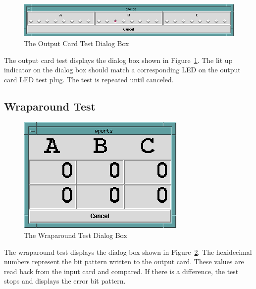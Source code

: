 \begin{figure}[hbpt]
\begin{centering}
\includegraphics{UTOutputTest.png}
\caption{The Output Card Test Dialog Box}
\label{fig:ut:outtest}
\end{centering}
\end{figure}
The output card test displays the dialog box shown in
Figure~\ref{fig:ut:outtest}.  The lit up indicator on the dialog box
should match a corresponding LED on the output card LED test plug. The
test is repeated until canceled.

\subsection{Wraparound Test}

\begin{figure}[hbpt]
\begin{centering}
\includegraphics{UTWrapAround.png}
\caption{The Wraparound Test Dialog Box}
\label{fig:ut:wraptest}
\end{centering}
\end{figure}
The wraparound test displays the dialog box shown in
Figure~\ref{fig:ut:wraptest}.  The hexidecimal numbers represent the bit
pattern written to the output card.  These values are read back from the
input card and compared.  If there is a difference, the test stops and
displays the error bit pattern.

